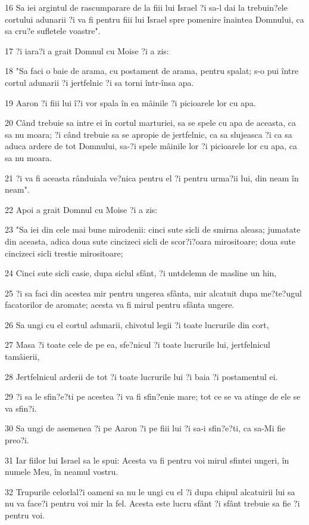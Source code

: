 \par 16 Sa iei argintul de rascumparare de la fiii lui Israel ?i sa-l dai la trebuin?ele cortului adunarii ?i va fi pentru fiii lui Israel spre pomenire înaintea Domnului, ca sa cru?e sufletele voastre".
\par 17 ?i iara?i a grait Domnul cu Moise ?i a zis:
\par 18 "Sa faci o baie de arama, cu postament de arama, pentru spalat; s-o pui între cortul adunarii ?i jertfelnic ?i sa torni într-însa apa.
\par 19 Aaron ?i fiii lui î?i vor spala în ea mâinile ?i picioarele lor cu apa.
\par 20 Când trebuie sa intre ei în cortul marturiei, sa se spele cu apa de aceasta, ca sa nu moara; ?i când trebuie sa se apropie de jertfelnic, ca sa slujeasca ?i ca sa aduca ardere de tot Domnului, sa-?i spele mâinile lor ?i picioarele lor cu apa, ca sa nu moara.
\par 21 ?i va fi aceasta rânduiala ve?nica pentru el ?i pentru urma?ii lui, din neam în neam".
\par 22 Apoi a grait Domnul cu Moise ?i a zis:
\par 23 "Sa iei din cele mai bune mirodenii: cinci sute sicli de smirna aleasa; jumatate din aceasta, adica doua sute cincizeci sicli de scor?i?oara mirositoare; doua sute cincizeci sicli trestie mirositoare;
\par 24 Cinci sute sicli casie, dupa siclul sfânt, ?i untdelemn de masline un hin,
\par 25 ?i sa faci din acestea mir pentru ungerea sfânta, mir alcatuit dupa me?te?ugul facatorilor de aromate; acesta va fi mirul pentru sfânta ungere.
\par 26 Sa ungi cu el cortul adunarii, chivotul legii ?i toate lucrurile din cort,
\par 27 Masa ?i toate cele de pe ea, sfe?nicul ?i toate lucrurile lui, jertfelnicul tamâierii,
\par 28 Jertfelnicul arderii de tot ?i toate lucrurile lui ?i baia ?i postamentul ei.
\par 29 ?i sa le sfin?e?ti pe acestea ?i va fi sfin?enie mare; tot ce se va atinge de ele se va sfin?i.
\par 30 Sa ungi de asemenea ?i pe Aaron ?i pe fiii lui ?i sa-i sfin?e?ti, ca sa-Mi fie preo?i.
\par 31 Iar fiilor lui Israel sa le spui: Acesta va fi pentru voi mirul sfintei ungeri, în numele Meu, în neamul vostru.
\par 32 Trupurile celorlal?i oameni sa nu le ungi cu el ?i dupa chipul alcatuirii lui sa nu va face?i pentru voi mir la fel. Acesta este lucru sfânt ?i sfânt trebuie sa fie ?i pentru voi.

